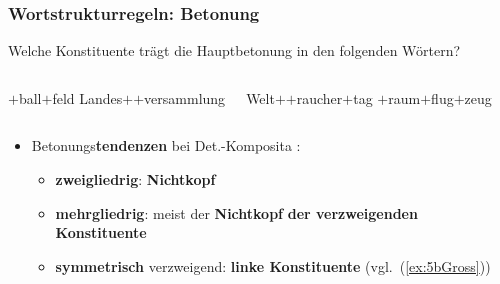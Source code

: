 \begin{frame}
\frametitle{Wortstrukturregeln: Betonung}

Welche Konstituente trägt die Hauptbetonung in den folgenden Wörtern?

\begin{columns}
	\ea\label{ex:5bFuss} $+$ball$+$feld
	\ex\label{ex:5bLandes} Landes$+$$+$versammlung
	\z 

	\ea\label{ex:5bWelt} Welt$+$$+$raucher$+$tag
	\ex\label{ex:5bGross} $+$raum$+$flug$+$zeug
	\z 
\end{columns}

\pause 

\begin{itemize}
	\item Betonungs\textbf{tendenzen} bei Det.-Komposita \citep[vgl.][131ff]{Grewendorf&Co91a}:
	\begin{itemize}
		
		\item \textbf{zweigliedrig}: \textbf{Nichtkopf}
	
		\item \textbf{mehrgliedrig}: meist der \textbf{Nichtkopf} \textbf{der verzweigenden Konstituente}
				
		\item \textbf{symmetrisch} verzweigend: \textbf{linke Konstituente} (vgl.\ (\ref{ex:5bGross}))
		
		
	\end{itemize}
\end{itemize}


\end{frame}
